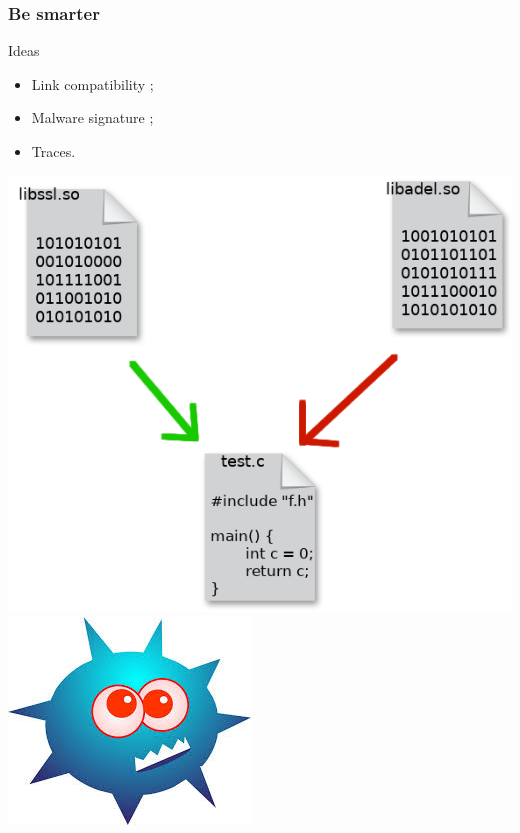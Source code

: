 \documentclass[11pt]{beamer}
\begin{document}
\begin{frame}
    \frametitle{Be smarter}

    \begin{block}{Ideas}
    \begin{itemize}
        \item Link compatibility ;
        \item Malware signature ;
        \item Traces.
    \end{itemize}
    \end{block}
    \vspace{-0.8em}
    \begin{center}
        \includegraphics[scale=0.2]{link.png}
    \includegraphics[scale=0.4]{malware.jpeg}

\end{center}
\end{frame}
\end{document}
